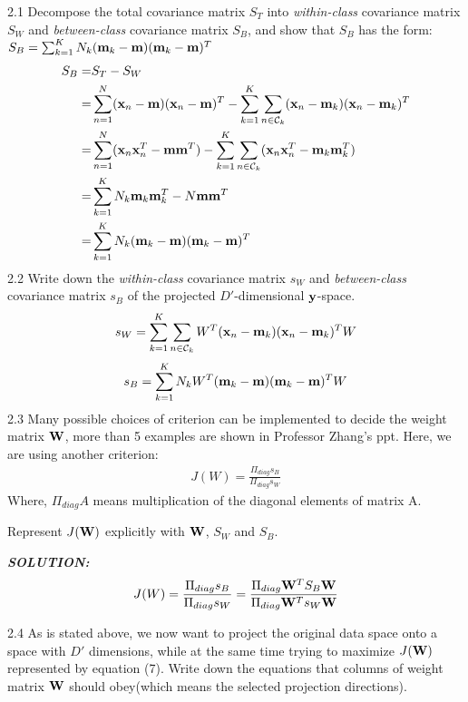 \documentclass{article}
\theoremstyle{definition}
\theoremstyle{definition}
\theoremstyle{remark}
\begin{document}
2.1 Decompose the total covariance matrix $S_{T}$ into \emph{within-class} covariance matrix $S_{W}$ and \emph{between-class} covariance matrix $S_{B}$, and show that $S_{B}$ has the form: $S_{B}=\sum_{k=1}^{K}N_{k}(\bold{m}_{k}-\bold{m})(\bold{m}_{k}-\bold{m})^{T}$
\begin{equation}\nonumber
\begin{aligned}
S_{B}=&S_T-S_W\\
=&\sum_{n=1}^{N}(\bold{x}_{n}-\bold{m})(\bold{x}_{n}-\bold{m})^{T}- \sum_{k=1}^{K}\sum_{n\in \mathcal{C}_{k}}(\bold{x}_{n}-\bold{m}_{k})(\bold{x}_{n}-\bold{m}_{k})^{T}\\
=& \sum_{n=1}^{N}(\bold{x}_{n}\bold{x}_{n}^T-\bold{m}\bold{m}^T)-\sum_{k=1}^{K}\sum_{n\in \mathcal{C}_{k}}(\bold{x}_{n}\bold{x}_{n}^T-\bold{m}_{k}\bold{m}_{k}^T)\\
=& \sum_{k=1}^{K}N_k\bold{m}_{k}\bold{m}_{k}^T-N\bold{m}\bold{m}^T\\
=& \sum_{k=1}^{K}N_k(\bold{m}_{k}-\bold{m})(\bold{m}_{k}-\bold{m})^T
\end{aligned}
\end{equation}
2.2 Write down the \emph{within-class} covariance matrix $s_{W}$ and \emph{between-class} covariance matrix $s_{B}$ of the projected $D'$-dimensional $\bold{y}$-space.
\[s_{W}=\sum_{k=1}^{K}\sum_{n\in \mathcal{C}_{k}}W^T(\bold{x}_{n}-\bold{m}_{k})(\bold{x}_{n}-\bold{m}_{k})^{T}W\]
\[s_{B}=\sum_{k=1}^{K}N_{k}W^T(\bold{m}_{k}-\bold{m})(\bold{m}_{k}-\bold{m})^{T}W\]
2.3 Many possible choices of criterion can be implemented to decide the weight matrix $\bold{W}$, more than 5 examples are shown in Professor Zhang's ppt. Here, we are using another criterion:
\begin{eqnarray}
J(W)=\frac{\Pi_{diag}s_{B}}{\Pi_{diag}s_{W}}
\end{eqnarray}
Where, $\Pi_{diag}A$ means multiplication of the diagonal elements of matrix A.

Represent $J(\bold{W})$ explicitly with $\bold{W}$, $S_{W}$ and $S_{B}$.

\emph{\textbf{SOLUTION:}}\\
\[J(W)=\frac{\Pi_{diag}s_{B}}{\Pi_{diag}s_{W}}= \frac{\Pi_{diag}\bold{W}^TS_{B}\bold{W}}{\Pi_{diag}\bold{W}^T s_{W}\bold{W}}\]

2.4 As is stated above, we now want to project the original data space onto a space with $D'$ dimensions, while at the same time trying to maximize $J(\bold{W})$ represented by equation (7). Write down the equations that columns of weight matrix $\bold{W}$ should obey(which means the selected projection directions).
\end{document}
